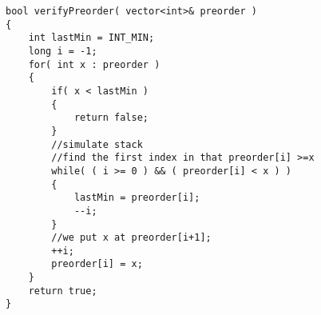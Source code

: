 \begin{lstlisting}[style=customc, caption={Constant Space}]
bool verifyPreorder( vector<int>& preorder )
{
    int lastMin = INT_MIN;
    long i = -1;
    for( int x : preorder )
    {
        if( x < lastMin )
        {
            return false;
        }
        //simulate stack
        //find the first index in that preorder[i] >=x
        while( ( i >= 0 ) && ( preorder[i] < x ) )
        {
            lastMin = preorder[i];
            --i;
        }
        //we put x at preorder[i+1];
        ++i;
        preorder[i] = x;
    }
    return true;
}
\end{lstlisting}
